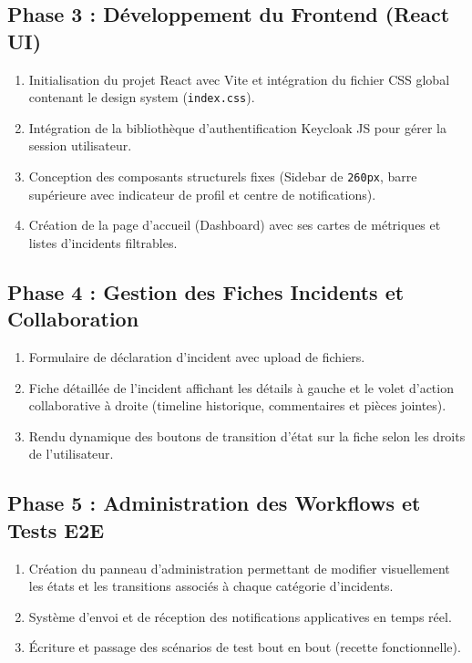 \documentclass[12pt,a4paper]{article}
\begin{document}
\subsection{Phase 3 : Développement du Frontend (React UI)}
\begin{enumerate}
    \item Initialisation du projet React avec Vite et intégration du fichier CSS global contenant le design system (\texttt{index.css}).
    \item Intégration de la bibliothèque d'authentification Keycloak JS pour gérer la session utilisateur.
    \item Conception des composants structurels fixes (Sidebar de \texttt{260px}, barre supérieure avec indicateur de profil et centre de notifications).
    \item Création de la page d'accueil (Dashboard) avec ses cartes de métriques et listes d'incidents filtrables.
\end{enumerate}

\subsection{Phase 4 : Gestion des Fiches Incidents et Collaboration}
\begin{enumerate}
    \item Formulaire de déclaration d'incident avec upload de fichiers.
    \item Fiche détaillée de l'incident affichant les détails à gauche et le volet d'action collaborative à droite (timeline historique, commentaires et pièces jointes).
    \item Rendu dynamique des boutons de transition d'état sur la fiche selon les droits de l'utilisateur.
\end{enumerate}

\subsection{Phase 5 : Administration des Workflows et Tests E2E}
\begin{enumerate}
    \item Création du panneau d'administration permettant de modifier visuellement les états et les transitions associés à chaque catégorie d'incidents.
    \item Système d'envoi et de réception des notifications applicatives en temps réel.
    \item Écriture et passage des scénarios de test bout en bout (recette fonctionnelle).
\end{enumerate}
\end{document}
